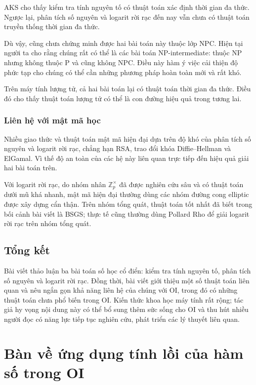 \documentclass[11pt]{article}
\begin{document}
AKS cho thấy kiểm tra tính nguyên tố có thuật toán xác định thời gian đa thức.
Ngược lại, phân tích số nguyên và logarit rời rạc đến nay vẫn chưa có thuật
toán truyền thống thời gian đa thức.

Dù vậy, cũng chưa chứng minh được hai bài toán này thuộc lớp NPC. Hiện tại
người ta cho rằng chúng rất có thể là các bài toán NP-intermediate: thuộc NP
nhưng không thuộc P và cũng không NPC. Điều này hàm ý việc cải thiện độ phức
tạp cho chúng có thể cần những phương pháp hoàn toàn mới và rất khó.

Trên máy tính lượng tử, cả hai bài toán lại có thuật toán thời gian đa thức.
Điều đó cho thấy thuật toán lượng tử có thể là con đường hiệu quả trong tương
lai.

\subsubsection{Liên hệ với mật mã học}

Nhiều giao thức và thuật toán mật mã hiện đại dựa trên độ khó của phân tích số
nguyên và logarit rời rạc, chẳng hạn RSA, trao đổi khóa Diffie--Hellman và
ElGamal. Vì thế độ an toàn của các hệ này liên quan trực tiếp đến hiệu quả giải
hai bài toán trên.

Với logarit rời rạc, do nhóm nhân \(\mathbb Z_p^\times\) đã được nghiên cứu
sâu và có thuật toán dưới mũ khá nhanh, mật mã hiện đại thường dùng các nhóm
đường cong elliptic được xây dựng cẩn thận. Trên nhóm tổng quát, thuật toán
tốt nhất đã biết trong bối cảnh bài viết là BSGS; thực tế cũng thường dùng
Pollard Rho để giải logarit rời rạc trên nhóm tổng quát.

\subsection{Tổng kết}

Bài viết thảo luận ba bài toán số học cổ điển: kiểm tra tính nguyên tố, phân
tích số nguyên và logarit rời rạc. Đồng thời, bài viết giới thiệu một số thuật
toán liên quan và nêu ngắn gọn khả năng liên hệ của chúng với OI, trong đó có
những thuật toán chưa phổ biến trong OI. Kiến thức khoa học máy tính rất rộng;
tác giả hy vọng nội dung này có thể bổ sung thêm sức sống cho OI và thu hút
nhiều người đọc có năng lực tiếp tục nghiên cứu, phát triển các lý thuyết liên
quan.

\section{Bàn về ứng dụng tính lồi của hàm số trong OI}
\end{document}
